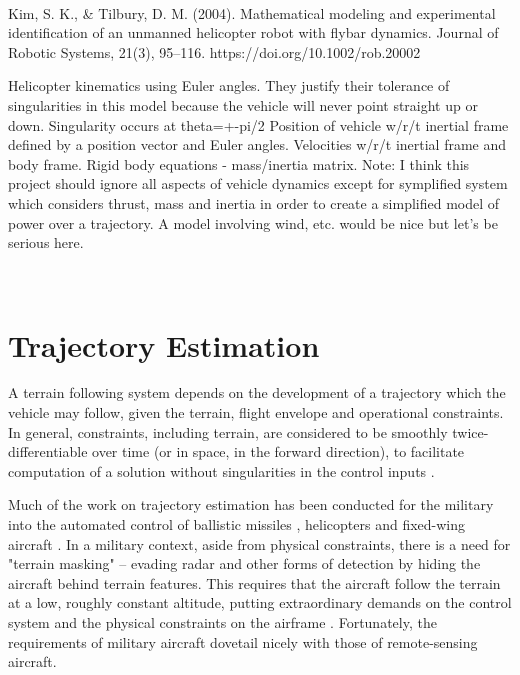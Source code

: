 ~~~

\cite{Kim2004}
Kim, S. K., \& Tilbury, D. M. (2004). Mathematical modeling and experimental identification of an unmanned helicopter robot with flybar dynamics. Journal of Robotic Systems, 21(3), 95–116. https://doi.org/10.1002/rob.20002

Helicopter kinematics using Euler angles. They justify their tolerance of singularities in this model because the vehicle will never point straight up or down. Singularity occurs at theta=+-pi/2
Position of vehicle w/r/t inertial frame defined by a position vector and Euler angles.
Velocities w/r/t inertial frame and body frame.
Rigid body equations - mass/inertia matrix.
Note: I think this project should ignore all aspects of vehicle dynamics except for symplified system which considers thrust, mass and inertia in order to create a simplified model of power over a trajectory. A model involving wind, etc. would be nice but let’s be serious here.


~~~




\section{Trajectory Estimation}

A terrain following system depends on the development of a trajectory which the vehicle may follow, given the terrain, flight envelope and operational constraints. In general, constraints, including terrain, are considered to be smoothly twice-differentiable over time (or in space, in the forward direction), to facilitate computation of a solution without singularities in the control inputs \cite{MENON1991,Funk1977}.

Much of the work on trajectory estimation has been conducted for the military into the automated control of ballistic missiles \cite{Dressler1968}, helicopters and fixed-wing aircraft \cite{MENON1991,Funk1977}. In a military context, aside from physical constraints, there is a need for "terrain masking" -- evading radar and other forms of detection by hiding the aircraft behind terrain features. This requires that the aircraft follow the terrain at a low, roughly constant altitude, putting extraordinary demands on the control system and the physical constraints on the airframe \cite{MENON1991}. Fortunately, the requirements of military aircraft dovetail nicely with those of remote-sensing aircraft.

